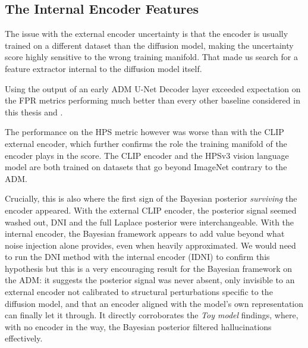 \subsection{The Internal Encoder Features}

The issue with the external encoder uncertainty is that the encoder is usually trained on a different dataset than the diffusion model, making the uncertainty score highly sensitive to the wrong training manifold. That made us search for a feature extractor internal to the diffusion model itself. 

Using the output of an early \acs{ADM} U-Net Decoder layer exceeded expectation on the \acs{FPR} metrics performing much better than every other baseline considered in this thesis and \cite{jazbec_generative_2025}. 

The performance on the \acs{HPS} metric however was worse than with the \acs{CLIP} external encoder, which further confirms the role the training manifold of the encoder plays in the score. The \acs{CLIP} encoder and the HPSv3 vision language model are both trained on datasets that go beyond ImageNet contrary to the \acs{ADM}. 

Crucially, this is also where the first sign of the Bayesian posterior \textit{surviving} the encoder appeared. With the external \acs{CLIP} encoder, the posterior signal seemed washed out, \acs{DNI} and the full Laplace posterior were interchangeable. With the internal encoder, the Bayesian framework appears to add value beyond what noise injection alone provides, even when heavily approximated. 
We would need to run the \acs{DNI} method with the internal encoder (\acs{IDNI}) to confirm this hypothesis but this is a very encouraging result for the Bayesian framework on the \acs{ADM}: it suggests the posterior signal was never absent, only invisible to an external encoder not calibrated to structural perturbations specific to the diffusion model, and that an encoder aligned with the model's own representation can finally let it through. It directly corroborates the \textit{Toy model} findings, where, with no encoder in the way, the Bayesian posterior filtered hallucinations effectively.


